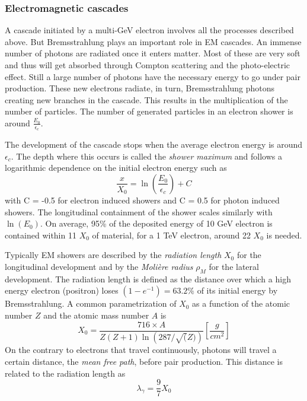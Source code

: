 \subsubsection{Electromagnetic cascades}
\label{subsubsec:EMcascade}

A cascade initiated by a multi-GeV electron involves all the processes described above. But Bremsstrahlung plays an important role in EM cascades. An immense number of photons are radiated once it enters matter. Most of these are very soft and thus will get absorbed through Compton scattering and the photo-electric effect. Still a large number of photons have the necessary energy to go under pair production. These new electrons radiate, in turn, Bremsstrahlung photons creating new branches in the cascade. This results in the multiplication of the number of particles. The number of generated particles in an electron shower is around $\frac{E_0}{\epsilon_{c}}$.

The development of the cascade stops when the average electron energy is around $\epsilon_{c}$. The depth where this occurs is called the \textit{shower maximum} and follows a logarithmic dependence on the initial electron energy such as \cite{Wigmans:392793}
\begin{equation}
  \frac{x}{X_0} = \ln\left(\frac{E_0}{\epsilon_{c}}\right) + C
\end{equation}
with C = -0.5 for electron induced showers and C = 0.5 for photon induced showers. The longitudinal containment of the shower scales similarly with $\ln\left(E_0\right)$. On average, 95\% of the deposited energy of 10 GeV electron is contained within 11 $X_0$ of material, for a 1 TeV electron, around 22 $X_0$ is needed.

Typically EM showers are described by the \textit{radiation length} $X_0$ for the longitudinal development and by the \textit{Moli\`ere radius} $\rho_{M}$ for the lateral development. The radiation length is defined as the distance over which a high energy electron (positron) loses $(1 - e^{-1}) = 63.2\%$ of its initial energy by Bremsstrahlung. A common parametrization of $X_0$ as a function of the atomic number $Z$ and the atomic mass number $A$ is \cite{Wigmans:392793}
\begin{equation}
  X_0 = \frac{716 \times A}{Z(Z+1)\ln\left(287/\sqrt(Z)\right)} [\frac{g}{cm^2}]
\end{equation}
On the contrary to electrons that travel continuously, photons will travel a certain distance, the \textit{mean free path}, before pair production. This distance is related to the radiation length as
\begin{equation}
  \lambda_{\gamma} = \frac{9}{7} X_0
\end{equation}


